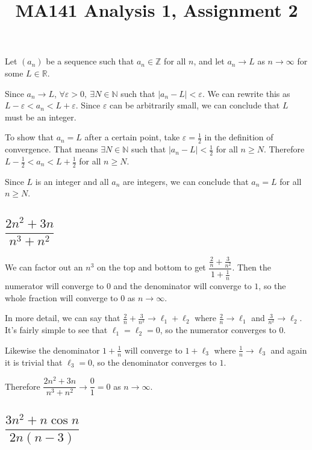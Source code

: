 \documentclass[a4paper]{article}
\title{MA141 Analysis 1, Assignment 2}
\begin{document}
\maketitle

\setlength{\parindent}{0em}
\setlength{\parskip}{1em}


Let $(a_n)$ be a sequence such that $a_n \in \mathbb Z$ for all $n$, and let $a_n \to L$ as $n \to \infty$ for some $L \in \mathbb R$.

Since $a_n \to L$, $\forall \varepsilon > 0,\ \exists N \in \mathbb N$ such that $|a_n - L| < \varepsilon$. We can rewrite this as $L - \varepsilon < a_n < L + \varepsilon$. Since $\varepsilon$ can be arbitrarily small, we can conclude that $L$ must be an integer.

To show that $a_n = L$ after a certain point, take $\varepsilon = \frac12$ in the definition of convergence. That means $\exists N \in \mathbb N$ such that $|a_n - L| < \frac12$ for all $n \ge N$. Therefore $L - \frac12 < a_n < L + \frac12$ for all $n \ge N$.

Since $L$ is an integer and all $a_n$ are integers, we can conclude that $a_n = L$ for all $n \ge N$.


\subsection{$\dfrac{2n^2 + 3n}{n^3 + n^2}$}

We can factor out an $n^3$ on the top and bottom to get $\dfrac{\frac{2}{n} + \frac{3}{n^2}}{1 + \frac{1}{n}}$. Then the numerator will converge to $0$ and the denominator will converge to $1$, so the whole fraction will converge to $0$ as $n \to \infty$.

In more detail, we can say that $\frac2n + \frac3{n^2} \to \ell_1 + \ell_2$ where $\frac2n \to \ell_1$ and $\frac3{n^2} \to \ell_2$. It's fairly simple to see that $\ell_1 = \ell_2 = 0$, so the numerator converges to $0$.

Likewise the denominator $1 + \frac1n$ will converge to $1 + \ell_3$ where $\frac1n \to \ell_3$ and again it is trivial that $\ell_3 = 0$, so the denominator converges to $1$.

Therefore $\dfrac{2n^2 + 3n}{n^3 + n^2} \to \dfrac01 = 0$ as $n \to \infty$.

\subsection{$\dfrac{3n^2 + n\cos n}{2n (n-3)}$}
\end{document}
